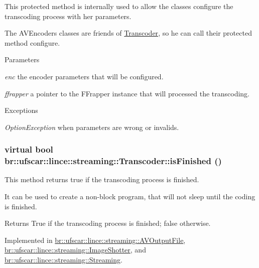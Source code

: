 This protected method is internally used to allow the classes configure the transcoding process with her parameters. 

The AVEncoders classes are friends of \hyperlink{classbr_1_1ufscar_1_1lince_1_1streaming_1_1Transcoder}{Transcoder}, so he can call their protected method configure. 
\begin{DoxyParams}{Parameters}
\item[{\em enc}]the encoder parameters that will be configured. \item[{\em ffrapper}]a pointer to the FFrapper instance that will processed the transcoding. \end{DoxyParams}

\begin{DoxyExceptions}{Exceptions}
\item[{\em OptionException}]when parameters are wrong or invalids. \end{DoxyExceptions}
\hypertarget{classbr_1_1ufscar_1_1lince_1_1streaming_1_1Transcoder_a6d2588da9583e98496882efa9b472ec4}{
\subsubsection[{isFinished}]{\setlength{\rightskip}{0pt plus 5cm}virtual bool br::ufscar::lince::streaming::Transcoder::isFinished ()}}
\label{classbr_1_1ufscar_1_1lince_1_1streaming_1_1Transcoder_a6d2588da9583e98496882efa9b472ec4}


This method returns true if the transcoding process is finished. 

It can be used to create a non-\/block program, that will not sleep until the coding is finished. \begin{DoxyReturn}{Returns}
True if the transcoding process is finished; false otherwise. 
\end{DoxyReturn}


Implemented in \hyperlink{classbr_1_1ufscar_1_1lince_1_1streaming_1_1AVOutputFile_a38f6acb7513f621bb7322bb31929fda0}{br::ufscar::lince::streaming::AVOutputFile}, \hyperlink{classbr_1_1ufscar_1_1lince_1_1streaming_1_1ImageShotter_af48a5173662f7dea91dc8140f5e501cc}{br::ufscar::lince::streaming::ImageShotter}, and \hyperlink{classbr_1_1ufscar_1_1lince_1_1streaming_1_1Streaming_ab9859ece4030fe9bf46416a5508f7a0c}{br::ufscar::lince::streaming::Streaming}.

